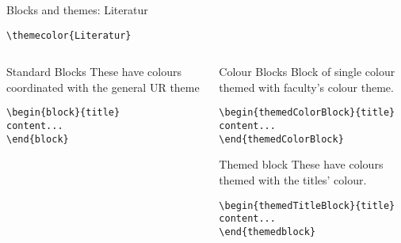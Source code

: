 \begingroup
{}
\begin{frame}[fragile]{Blocks and themes: Literatur}
    \begin{center}\verb|\themecolor{Literatur}|\end{center}
\begin{columns} %
\begin{column}{0.3\textwidth}
\begin{block}{Standard Blocks}
These have colours coordinated with the general UR theme
\begin{verbatim}
\begin{block}{title}
content...
\end{block}
\end{verbatim}
\end{block}
\end{column}
\begin{column}{0.7\textwidth}
\begin{themedColorBlock}{Colour Blocks}
Block of single colour themed with faculty's colour theme.
\small
\begin{verbatim}
\begin{themedColorBlock}{title}
content...
\end{themedColorBlock}
\end{verbatim}
\end{themedColorBlock}
\begin{themedTitleBlock} {Themed block}
These have colours themed with the titles' colour.
\small
\begin{verbatim}
\begin{themedTitleBlock}{title}
content...
\end{themedblock}
\end{verbatim}
\end{themedTitleBlock}
\end{column}
\end{columns}
\end{frame}
\endgroup


